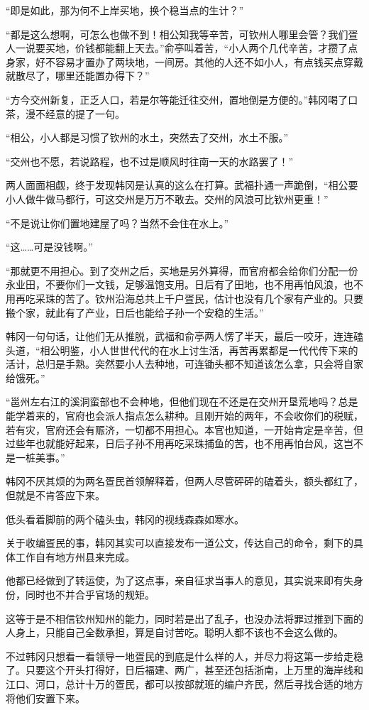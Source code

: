 “即是如此，那为何不上岸买地，换个稳当点的生计？”

“都是这么想啊，可怎么也做不到！相公知我等辛苦，可钦州人哪里会管？我们疍人一说要买地，价钱都能翻上天去。”俞亭叫着苦，“小人两个几代辛苦，才攒了点身家，好不容易才置办了两块地，一间房。其他的人还不如小人，有点钱买点穿戴就散尽了，哪里还能置办得下？”

“方今交州新复，正乏人口，若是尔等能迁往交州，置地倒是方便的。”韩冈喝了口茶，漫不经意的提了一句。

“相公，小人都是习惯了钦州的水土，突然去了交州，水土不服。”

“交州也不愿，若说路程，也不过是顺风时往南一天的水路罢了！”

两人面面相觑，终于发现韩冈是认真的这么在打算。武福扑通一声跪倒，“相公要小人做牛做马都行，可这交州是万万不敢去。交州的风浪可比钦州更重！”

“不是说让你们置地建屋了吗？当然不会住在水上。”

“这……可是没钱啊。”

“那就更不用担心。到了交州之后，买地是另外算得，而官府都会给你们分配一份永业田，不要你们一文钱，足够温饱支用。日后有了田地，也不用再怕风浪，也不用再吃采珠的苦了。钦州沿海总共上千户疍民，估计也没有几个家有产业的。只要搬个家，就此有了产业，日后也能给子孙一个安稳的生活。”

韩冈一句句话，让他们无从推脱，武福和俞亭两人愣了半天，最后一咬牙，连连磕头道，“相公明鉴，小人世世代代的在水上讨生活，再苦再累都是一代代传下来的活计，总归是手熟。突然要小人去种地，可连锄头都不知道该怎么拿，只会将自家给饿死。”

“邕州左右江的溪洞蛮部也不会种地，但他们现在不还是在交州开垦荒地吗？总是能学着来的，官府也会派人指点怎么耕种。且刚开始的两年，不会收你们的税赋，若有灾，官府还会有赈济，一切都不用担心。本官也知道，一开始肯定是辛苦，但过些年也就能好起来，日后子孙不用再吃采珠捕鱼的苦，也不用再怕台风，这岂不是一桩美事。”

韩冈不厌其烦的为两名疍民首领解释着，但两人尽管砰砰的磕着头，额头都红了，但就是不肯答应下来。

低头看着脚前的两个磕头虫，韩冈的视线森森如寒水。

关于收编疍民的事，韩冈其实可以直接发布一道公文，传达自己的命令，剩下的具体工作自有地方州县来完成。

他都已经做到了转运使，为了这点事，亲自征求当事人的意见，其实说来即有失身份，同时也不并合乎官场的规矩。

这等于是不相信钦州知州的能力，同时若是出了乱子，也没办法将罪过推到下面的人身上，只能自己全数承担，算是自讨苦吃。聪明人都不该也不会这么做的。

不过韩冈只想看一看领导一地疍民的到底是什么样的人，并尽力将这第一步给走稳了。只要这个开头打得好，日后福建、两广，甚至还包括浙南，上万里的海岸线和江口、河口，总计十万的疍民，都可以按部就班的编户齐民，然后寻找合适的地方将他们安置下来。

